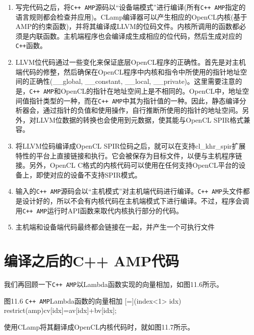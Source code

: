 \begin{enumerate}
\item 写完代码之后，将\texttt{C++ AMP}源码以“设备端模式”进行编译(所有\texttt{C++ AMP}指定的语言规则都会检查并应用)。CLamp编译器可以产生相应的OpenCL内核(基于AMP的约束函数)，并将其编译成LLVM的位码文件。内核所调用的函数都必须是内联函数。主机端程序也会编译成生成相应的位代码，然后生成对应的\texttt{C++}函数。
\item LLVM位代码通过一些变化来保证底层OpenCL程序的正确性。首先是对主机端代码的修整，然后确保在OpenCL程序中内核和指令中所使用的指针地址空间的正确性(\_\allowbreak{}\_\allowbreak{}global, \_\allowbreak{}\_\allowbreak{}constant, \_\allowbreak{}\_\allowbreak{}local, \_\allowbreak{}\_\allowbreak{}private)。这里需要注意的是，\texttt{C++ AMP}和OpenCL的指针在地址空间上是不相同的。OpenCL中，地址空间值指针类型的一种，而在\texttt{C++ AMP}中其为指针值的一种。因此，静态编译分析器会，通过指针的负值和使用操作，自行推断所使用的指针的地址空间。另外，对LLVM位数据的转换也会使用到元数据，使其能与OpenCL SPIR格式兼容。
\item 将LLVM位码编译成OpenCL SPIR位码之后，就可以在支持cl\_\allowbreak{}khr\_\allowbreak{}spir扩展特性的平台上直接链接和执行。它会被保存为目标文件，以便与主机程序链接。另外，OpenCL C格式的内核代码可以使用在任何支持OpenCL平台的设备上，即使对应的设备不支持SPIR模式。
\item 输入的\texttt{C++ AMP}源码会以“主机模式”对主机端代码进行编译。\texttt{C++ AMP}头文件都是设计好的，所以不会有内核代码在主机端模式下进行编译。不过，程序会调用\texttt{C++ AMP}运行时API函数来取代内核执行部分的代码。
\item 主机端和设备端代码最终都会链接在一起，并产生一个可执行文件
\end{enumerate}



\section{编译之后的C++ AMP代码}

我们再回顾一下\texttt{C++ AMP}以Lambda函数实现的向量相加，如图11.6所示。

\begin{codeboxt}[cpp]{图11.6 \texttt{C++ AMP}Lambda函数的向量相加}
[=](index<1> idx) restrict(amp){cv[idx]=av[idx]+bv[idx];}
\end{codeboxt}

使用CLamp将其翻译成OpenCL内核代码时，就如图11.7所示。

